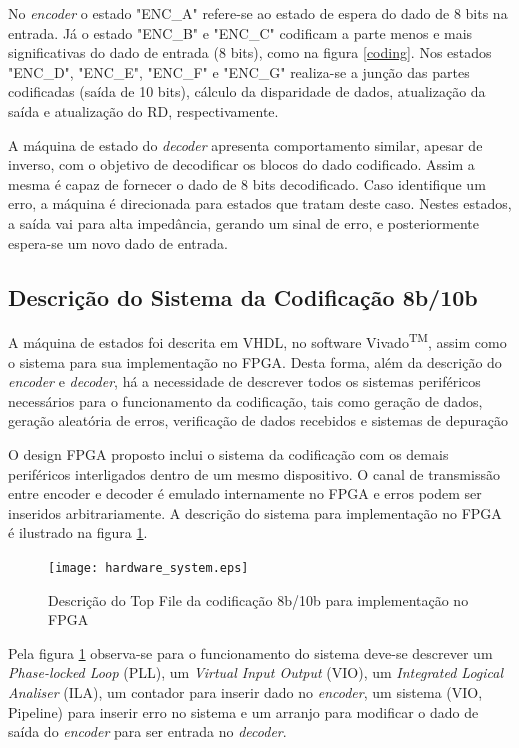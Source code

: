 \documentclass[11pt,twocolumn]{article}
\begin{document}
No \textit{encoder} o estado "ENC\_A" refere-se ao estado de espera do dado de 8 bits na entrada. Já o estado "ENC\_B" e "ENC\_C" codificam a parte menos e mais significativas do dado de entrada (8 bits), como na figura \ref{coding}. Nos estados "ENC\_D", "ENC\_E", "ENC\_F" e "ENC\_G" realiza-se a junção das partes codificadas (saída de 10 bits), cálculo da disparidade de dados, atualização da saída e atualização do RD, respectivamente. 

A máquina de estado do \textit{decoder} apresenta comportamento similar, apesar de inverso, com o objetivo de decodificar os blocos do dado codificado. Assim a mesma é capaz de fornecer o dado de 8 bits decodificado. Caso identifique um erro, a máquina é direcionada para estados que tratam deste caso. Nestes estados, a saída vai para alta impedância, gerando um sinal de erro, e posteriormente espera-se um novo dado de entrada. 

\subsection{Descrição do Sistema da Codificação 8b/10b}
A máquina de estados foi descrita em VHDL, no software Vivado\textsuperscript{TM}, assim como o sistema para sua implementação no FPGA. Desta forma, além da descrição do \textit{encoder} e \textit{decoder}, há a necessidade de descrever todos os sistemas periféricos necessários para o funcionamento da codificação, tais como geração de dados, geração aleatória de erros, verificação de dados recebidos e sistemas de depuração 

O design FPGA proposto inclui o sistema da codificação com os demais periféricos interligados dentro de um mesmo dispositivo. O canal de transmissão entre encoder e decoder é emulado internamente no FPGA e erros podem ser inseridos arbitrariamente. A descrição do sistema para implementação no FPGA é ilustrado na figura \ref{implementation}.

\begin{figure}[htb]
	\centering
	\texttt{[image: hardware\_system.eps]}
	\caption{Descrição do Top File da codificação 8b/10b para implementação no FPGA}
	\label{implementation}
\end{figure}

Pela figura \ref{implementation} observa-se para o funcionamento do sistema deve-se descrever um \textit{Phase-locked Loop} (PLL), um \textit{Virtual Input Output} (VIO), um \textit{Integrated Logical Analiser} (ILA), um contador para inserir dado no \textit{encoder}, um sistema (VIO, Pipeline) para inserir erro no sistema e um arranjo para modificar o dado de saída do \textit{encoder} para ser entrada no \textit{decoder}.
\end{document}
